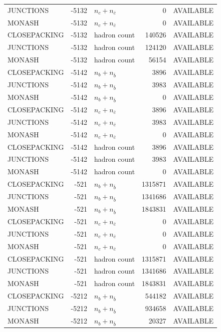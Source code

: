 \begin{landscape}
\begin{longtable}{@{}lrlrl@{}}
JUNCTIONS & -5132 & $n_c+n_{\bar c}$ & \num{0} & AVAILABLE \\
MONASH & -5132 & $n_c+n_{\bar c}$ & \num{0} & AVAILABLE \\
CLOSEPACKING & -5132 & hadron count & \num{140526} & AVAILABLE \\
JUNCTIONS & -5132 & hadron count & \num{124120} & AVAILABLE \\
MONASH & -5132 & hadron count & \num{56154} & AVAILABLE \\
CLOSEPACKING & -5142 & $n_b+n_{\bar b}$ & \num{3896} & AVAILABLE \\
JUNCTIONS & -5142 & $n_b+n_{\bar b}$ & \num{3983} & AVAILABLE \\
MONASH & -5142 & $n_b+n_{\bar b}$ & \num{0} & AVAILABLE \\
CLOSEPACKING & -5142 & $n_c+n_{\bar c}$ & \num{3896} & AVAILABLE \\
JUNCTIONS & -5142 & $n_c+n_{\bar c}$ & \num{3983} & AVAILABLE \\
MONASH & -5142 & $n_c+n_{\bar c}$ & \num{0} & AVAILABLE \\
CLOSEPACKING & -5142 & hadron count & \num{3896} & AVAILABLE \\
JUNCTIONS & -5142 & hadron count & \num{3983} & AVAILABLE \\
MONASH & -5142 & hadron count & \num{0} & AVAILABLE \\
CLOSEPACKING & -521 & $n_b+n_{\bar b}$ & \num{1315871} & AVAILABLE \\
JUNCTIONS & -521 & $n_b+n_{\bar b}$ & \num{1341686} & AVAILABLE \\
MONASH & -521 & $n_b+n_{\bar b}$ & \num{1843831} & AVAILABLE \\
CLOSEPACKING & -521 & $n_c+n_{\bar c}$ & \num{0} & AVAILABLE \\
JUNCTIONS & -521 & $n_c+n_{\bar c}$ & \num{0} & AVAILABLE \\
MONASH & -521 & $n_c+n_{\bar c}$ & \num{0} & AVAILABLE \\
CLOSEPACKING & -521 & hadron count & \num{1315871} & AVAILABLE \\
JUNCTIONS & -521 & hadron count & \num{1341686} & AVAILABLE \\
MONASH & -521 & hadron count & \num{1843831} & AVAILABLE \\
CLOSEPACKING & -5212 & $n_b+n_{\bar b}$ & \num{544182} & AVAILABLE \\
JUNCTIONS & -5212 & $n_b+n_{\bar b}$ & \num{934658} & AVAILABLE \\
MONASH & -5212 & $n_b+n_{\bar b}$ & \num{20327} & AVAILABLE \\

\end{longtable}
\end{landscape}

